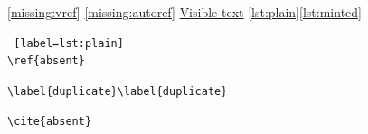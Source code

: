 \vref{missing:vref}
\autoref{missing:autoref}
\hyperref[missing:hyperref]{Visible text}
\ref{lst:plain}\cref{lst:minted}
\begin{lstlisting} [label=lst:plain]
\ref{absent}
\end{lstlisting}
\begin{lstlisting}[caption={An invented controller, label=literal text},label={lst:braced}]
\label{duplicate}\label{duplicate}
\end{lstlisting}
\begin{verbatim}
\cite{absent}
\end{verbatim}
\nocite{*}
